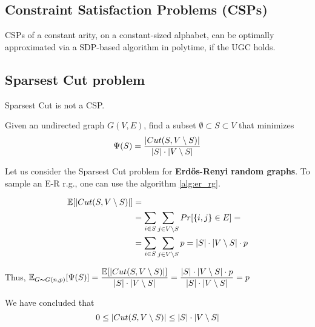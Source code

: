 \subsection{Constraint Satisfaction Problems (CSPs)}
    CSPs of a constant arity, on a constant-sized alphabet, can be optimally approximated via a SDP-based algorithm in polytime, if the UGC holds.


\subsection{Sparsest Cut problem}
    Sparsest Cut is not a CSP.\@

    Given an undirected graph $G(V,E)$, find a subset $\emptyset \subset S \subset V$ that minimizes
    \[ \Psi(S) = \dfrac{\vert Cut(S, V \setminus S) \vert}{\vert S \vert \cdot \vert V \setminus S \vert} \]

    Let us consider the Sparsest Cut problem for \textbf{Erd\H{o}s-Renyi random graphs}.
    To sample an E-R r.g., one can use the algorithm \ref{alg:er_rg}.

    


    \begin{equation*}
        \begin{split}
            \mathbb{E}[\vert Cut(S, V \setminus S) \vert] &=\\
                &= \sum_{i \in S} \sum_{j \in V \setminus S} Pr[\{ i,j \} \in E] =\\
                &= \sum_{i \in S} \sum_{j \in V \setminus S} p = \vert S \vert \cdot \vert V \setminus S \vert \cdot p
        \end{split}
    \end{equation*}

    Thus, $\mathbb{E}_{G \thicksim G(n,p)}[\Psi(S)] =
    \dfrac{\mathbb{E}[\vert Cut(S, V \setminus S) \vert]}{\vert S \vert \cdot \vert V \setminus S \vert} =
    \dfrac{ \vert S \vert \cdot \vert V \setminus S \vert \cdot p}{\vert S \vert \cdot \vert V \setminus S \vert} = 
    p$

    We have concluded that
    \[ 0 \leq \vert Cut(S, V \setminus S) \vert \leq \vert S \vert \cdot \vert V \setminus S \vert \]


